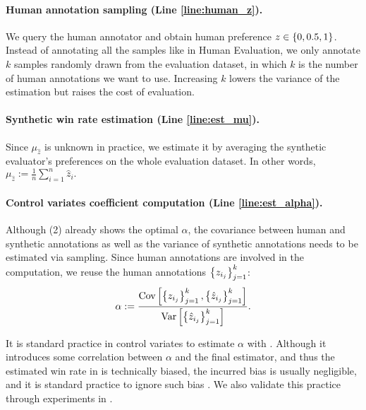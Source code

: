 \paragraph{Human annotation sampling (Line \ref{line:human_z}).}
We query the human annotator and obtain human preference $z \in \{0,0.5,1\}$. Instead of annotating all the samples like in Human Evaluation, we only annotate $k$ samples randomly drawn from the evaluation dataset, in which $k$ is the number of human annotations we want to use. Increasing $k$ lowers the variance of the estimation but raises the cost of evaluation. 

\paragraph{Synthetic win rate estimation (Line \ref{line:est_mu}).} Since $\mu_{\hat z}$ is unknown in practice, we estimate it by averaging the synthetic evaluator's preferences on the whole evaluation dataset. In other words,
$
\mu_{\hat z} := \frac{1}{n} \sum_{i=1}^n \hat z_{i}.
$

\paragraph{Control variates coefficient computation (Line \ref{line:est_alpha}).} 
Although (2) already shows the optimal $\alpha$, the covariance between human and synthetic annotations as well as the variance of synthetic annotations needs to be estimated via sampling. Since human annotations are involved in the computation, we reuse the human annotations $\left\{z_{i_j}\right\}_{j=1}^k$:
\begin{align}
\alpha := \frac{\mathrm{Cov}\left[\left\{z_{i_j}\right\}_{j=1}^k, \left\{\hat z_{i_j}\right\}_{j=1}^k\right]}{\mathrm{Var}\left[\left\{\hat z_{i_j}\right\}_{j=1}^k\right]}.
\label{eq:alpha_est}
\end{align}

It is standard practice in control variates to estimate $\alpha$ with  \citep[Chapter 8.9]{mcbook}.  Although it introduces some correlation between $\alpha$ and the final estimator, and thus the estimated win rate in  is technically biased, the incurred bias is usually negligible, and it is standard practice to ignore such bias \citep[Chapter 8.9]{mcbook}. We also validate this practice through experiments in . 
\loose


